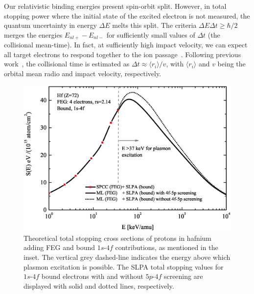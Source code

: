 \documentclass[aps,pra,reprint,groupedaddress]{revtex4-1}
\begin{document}
Our relativistic binding energies present spin-orbit split. However, in total stopping power where the initial state of the excited electron is not measured, the quantum uncertainty in energy $\Delta E$ melts this split. The criteria $\Delta E\Delta t\geq\hbar/2$ merges the energies $E_{nl+}-E_{nl-}$ for sufficiently small values of $\Delta t$ (the collisional mean-time). In fact, at sufficiently high impact velocity, we can expect all target electrons to respond together to the ion passage~\cite{lindhard53,chu72}. Following previous work~\cite{mon09}, the collisional time is estimated as $\Delta t\approx\langle r_i\rangle/v$, with $\langle r_i\rangle$ and $v$ being the orbital mean radio and impact velocity, respectively. 



\begin{figure}[!t]
\centering
\includegraphics[width=13.cm]{Fig02.eps}
\caption{Theoretical total stopping cross sections of protons in hafnium adding FEG and bound $1s$-$4f$ contributions, as mentioned in the inset. The vertical grey dashed-line indicates the energy above which plasmon excitation is possible. %
The SLPA total stopping values for $1s$-$4f$ bound electrons with and without $5p$-$4f$ screening are displayed with solid and dotted lines, respectively.}
\label{slpa4f}
\end{figure}
\end{document}
